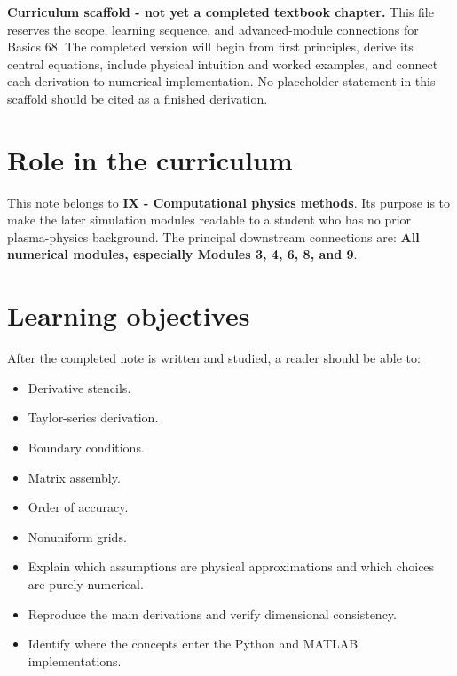 \documentclass[11pt]{article}
\begin{document}

\begin{overviewbox}
\textbf{Curriculum scaffold - not yet a completed textbook chapter.} This file reserves the scope, learning sequence, and advanced-module connections for Basics 68. The completed version will begin from first principles, derive its central equations, include physical intuition and worked examples, and connect each derivation to numerical implementation. No placeholder statement in this scaffold should be cited as a finished derivation.
\end{overviewbox}

\ProjectTOC

\section{Role in the curriculum}
This note belongs to \textbf{IX - Computational physics methods}. Its purpose is to make the later simulation modules readable to a student who has no prior plasma-physics background. The principal downstream connections are: \textbf{All numerical modules, especially Modules 3, 4, 6, 8, and 9}.

\section{Learning objectives}
After the completed note is written and studied, a reader should be able to:
\begin{itemize}[leftmargin=1.6em]
\item Derivative stencils.
\item Taylor-series derivation.
\item Boundary conditions.
\item Matrix assembly.
\item Order of accuracy.
\item Nonuniform grids.
\item Explain which assumptions are physical approximations and which choices are purely numerical.
\item Reproduce the main derivations and verify dimensional consistency.
\item Identify where the concepts enter the Python and MATLAB implementations.
\end{itemize}
\end{document}
